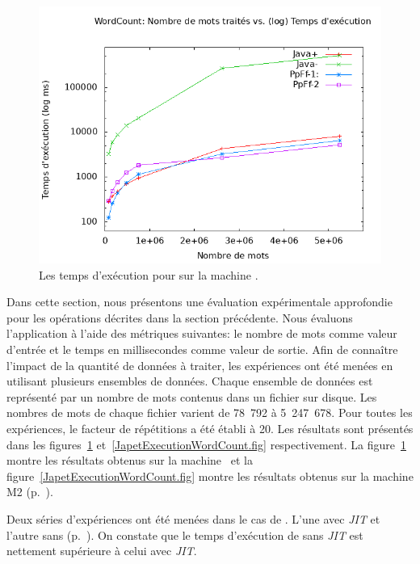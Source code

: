 \begin{figure}[H]
\centering
     \includegraphics[width=1.0\textwidth]{Figures/GrapheTempsWordCount.png}
      \caption{Les temps d'ex\'ecution pour  sur la machine .}
       \label{GrapheTempsWordCount.fig}
\end{figure}



Dans cette section, nous présentons une \'evaluation exp\'erimentale approfondie pour les op\'erations d\'ecrites dans la section pr\'ec\'edente. Nous \'evaluons l'application  \`a l'aide des m\'etriques suivantes: le nombre de mots comme valeur d'entr\'ee et le temps en millisecondes comme valeur de sortie. Afin de conna\^itre l'impact de la quantit\'e de donn\'ees \`a traiter, les exp\'eriences ont \'et\'e men\'ees en utilisant plusieurs ensembles de donn\'ees. Chaque ensemble de donn\'ees est repr\'esent\'e par un nombre de mots contenus dans un fichier sur disque. Les nombres de mots de chaque fichier varient de 78~792 \`a 5~247~678. Pour toutes les exp\'eriences, le facteur de r\'ep\'etitions a \'et\'e \'etabli \`a 20.  Les r\'esultats sont pr\'esent\'es dans les figures~\ref{GrapheTempsWordCount.fig} et~\ref{JapetExecutionWordCount.fig} respectivement. La figure~\ref{GrapheTempsWordCount.fig} montre les résultats obtenus sur la machine \ et la figure~\ref{JapetExecutionWordCount.fig} montre les r\'esultats obtenus sur la machine M2 (p.~\pageref{machines.sect}).

Deux s\'eries d'exp\'eriences ont \'et\'e men\'ees dans le cas de . L'une avec \emph{JIT} et l'autre sans (p.~\pageref{jitDescription.sect}). On constate que le temps d'ex\'ecution de  sans \emph{JIT} est nettement sup\'erieure \`a celui avec \emph{JIT}.

